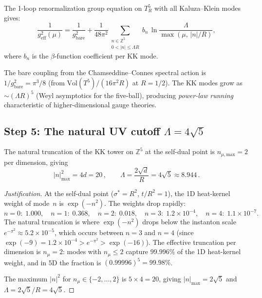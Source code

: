 \begin{theorem}\label{thm:KKRG}
The 1-loop renormalization group equation on $T^5_R$ with all
Kaluza--Klein modes gives:
\begin{equation}\label{eq:RG}
  \frac{1}{g^2_{\mathrm{eff}}(\mu)}
  = \frac{1}{g^2_{\mathrm{bare}}}
  + \frac{1}{48\pi^2}\sum_{\substack{n\in\mathbb{Z}^5\\0<|n|\leq\Lambda R}}
    b_n \,\ln\!\frac{\Lambda}{\max(\mu,\,|n|/R)},
\end{equation}
where $b_n$ is the $\beta$-function coefficient per KK mode.
\end{theorem}

The bare coupling from the Chamseddine--Connes spectral action is
$1/g^2_{\mathrm{bare}} = \pi^3/8$ (from $\mathrm{Vol}(T^5)/(16\pi^2 R)$
at $R=1/2$).  The KK modes grow as $\sim(\Lambda R)^5$ (Weyl
asymptotics for the five-ball), producing \emph{power-law running}
characteristic of higher-dimensional gauge theories.

\subsection{Step 5: The natural UV cutoff $\Lambda = 4\sqrt{5}$}
\label{sec:cutoff}

\begin{proposition}\label{prop:cutoff}
The natural truncation of the KK tower on $\mathbb{Z}^5$ at the
self-dual point is $n_{\mu,\mathrm{max}}=2$ per dimension, giving
\begin{equation}\label{eq:Lambda}
  |n|^2_{\mathrm{max}} = 4d = 20\,,\qquad
  \Lambda = \frac{2\sqrt{d}}{R} = 4\sqrt{5} \approx 8.944\,.
\end{equation}
\end{proposition}

\begin{proof}[Justification]
At the self-dual point ($\sigma^*=R^2$, $t/R^2=1$), the 1D heat-kernel
weight of mode~$n$ is $\exp(-n^2)$.  The weights drop rapidly:
\[
  n=0:\;1.000,\quad n=1:\;0.368,\quad n=2:\;0.018,\quad
  n=3:\;1.2\times 10^{-4},\quad n=4:\;1.1\times 10^{-7}.
\]
The natural truncation is where $\exp(-n^2)$ drops below the
instanton scale $e^{-\pi^2}\approx 5.2\times 10^{-5}$, which
occurs between $n=3$ and $n=4$ (since $\exp(-9)=1.2\times 10^{-4}
> e^{-\pi^2} > \exp(-16)$).  The effective truncation per dimension
is $n_\mu=2$: modes with $n_\mu\leq 2$ capture $99.996\%$ of the
1D heat-kernel weight, and in 5D the fraction is
$(0.99996)^5 = 99.98\%$.

The maximum $|n|^2$ for $n_\mu\in\{-2,\ldots,2\}$ is
$5\times 4 = 20$, giving $|n|_{\mathrm{max}}=2\sqrt{5}$ and
$\Lambda = 2\sqrt{5}/R = 4\sqrt{5}$.
\end{proof}

